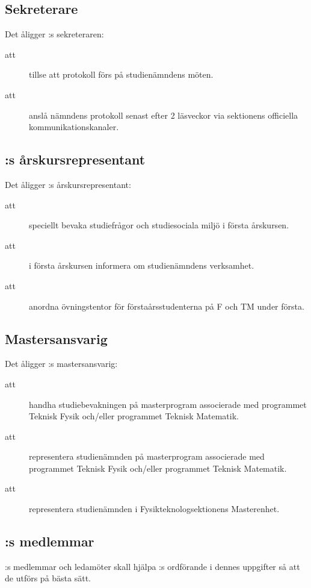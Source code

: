 \subsection{Sekreterare}
Det åligger \forening:s sekreteraren:
\begin{description}
    \item[att] tillse att protokoll förs på studienämndens möten.
    \item[att] anslå nämndens protokoll senast efter 2 läsveckor via sektionens officiella kommunikationskanaler. 
\end{description}

\subsection{\forening :s årskursrepresentant}
    Det åligger \forening:s årskursrepresentant:
\begin{description}
      \item[att] speciellt bevaka studiefrågor och studiesociala miljö i första årskursen.
      \item[att] i första årskursen informera om studienämndens verksamhet.
      \item[att] anordna övningstentor för förstaårsstudenterna på F och TM under första.
\end{description}

\subsection{Mastersansvarig}
Det åligger \forening:s mastersansvarig:
\begin{description}
      \item [att] handha studiebevakningen på masterprogram
      associerade med programmet Teknisk Fysik och/eller programmet Teknisk Matematik.
      \item [att] representera studienämnden på masterprogram associerade med
      programmet Teknisk Fysik och/eller programmet Teknisk Matematik.
      \item [att] representera studienämnden i Fysikteknologsektionens Masterenhet.
\end{description}
    

\subsection{\forening :s medlemmar}
\forening:s medlemmar och ledamöter skall hjälpa \forening:s ordförande i dennes uppgifter så att de utförs på bästa sätt.

